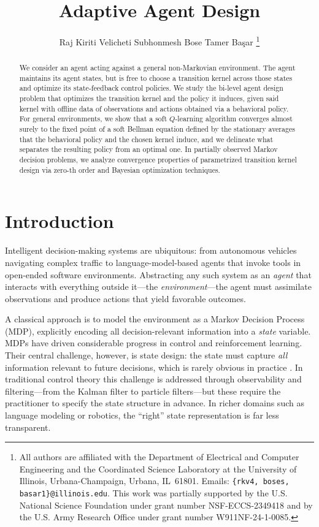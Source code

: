 \documentclass[12pt]{article}
\title{Adaptive Agent Design}
\author{Raj Kiriti Velicheti \qquad Subhonmesh Bose \qquad Tamer Ba\c{s}ar
\thanks{All authors are affiliated with the Department of Electrical and Computer
Engineering and the Coordinated Science Laboratory at the University of Illinois,
Urbana-Champaign, Urbana, IL~61801. Emails: \texttt{\{rkv4, boses, basar1\}@illinois.edu}.
This work was partially supported by the U.S. National Science Foundation under grant
number NSF-ECCS-2349418 and by the U.S. Army Research Office under grant number
W911NF-24-1-0085.}}
\renewcommand{\[}{\left[}
\renewcommand{\]}{\right]}
\renewcommand{\(}{\left(}
\renewcommand{\)}{\right)}
\newcounter{l1}
\newcounter{l2}
\newcounter{l3}
\begin{document}
\maketitle

\begin{abstract}
We consider an agent acting against a general non-Markovian environment. The agent maintains its agent states, but is free to choose a transition kernel across those states and optimize its state-feedback control policies. We study the bi-level agent design problem that optimizes the transition kernel and the policy it induces, given said kernel with offline data of observations and actions obtained via a behavioral policy. For general environments, we show that a soft $Q$-learning algorithm converges almost surely to the fixed point of a soft Bellman equation defined by the stationary averages that the behavioral policy and the chosen kernel induce, and we delineate what separates the resulting policy from an optimal one. In partially observed Markov decision problems, we analyze convergence properties of parametrized transition kernel design via zero-th order and Bayesian optimization techniques.
\end{abstract}

\section{Introduction}

Intelligent decision-making systems are ubiquitous: from autonomous vehicles navigating
complex traffic to language-model-based agents that invoke tools in open-ended software
environments. Abstracting any such system as an \emph{agent} that interacts with
everything outside it---the \emph{environment}---the agent must assimilate observations
and produce actions that yield favorable outcomes.

A classical approach is to model the environment as a Markov Decision Process (MDP),
explicitly encoding all decision-relevant information into a \emph{state} variable.
MDPs have driven considerable progress in control and reinforcement learning. Their
central challenge, however, is state design: the state must capture \emph{all}
information relevant to future decisions, which is rarely obvious in practice \cite{yuksel2024stochastic}. In
traditional control theory this challenge is addressed through observability and
filtering---from the Kalman filter to particle filters---but these require the
practitioner to specify the state structure in advance. In richer domains such as
language modeling or robotics, the ``right'' state representation is far less transparent.
\end{document}
